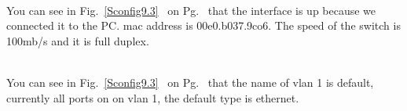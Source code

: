 \documentclass{report}
\begin{document}
\\You can see in Fig.~\ref{Sconfig9.3}~ 
on Pg.~\pageref{Sconfig9.3} that the interface is up because we connected it to
the PC. mac address is 00e0.b037.9co6. The speed of the switch is 100mb/s and
it is full duplex. 
\hfill\break

\\You can see in Fig.~\ref{Sconfig9.3}~ 
on Pg.~\pageref{Sconfig9.3} that the name of vlan 1 is default, currently all
ports on on vlan 1, the default type is ethernet.

\begin{figure}[!b]\centering
{}\hfill
{}\par

\end{figure}
\end{document}
